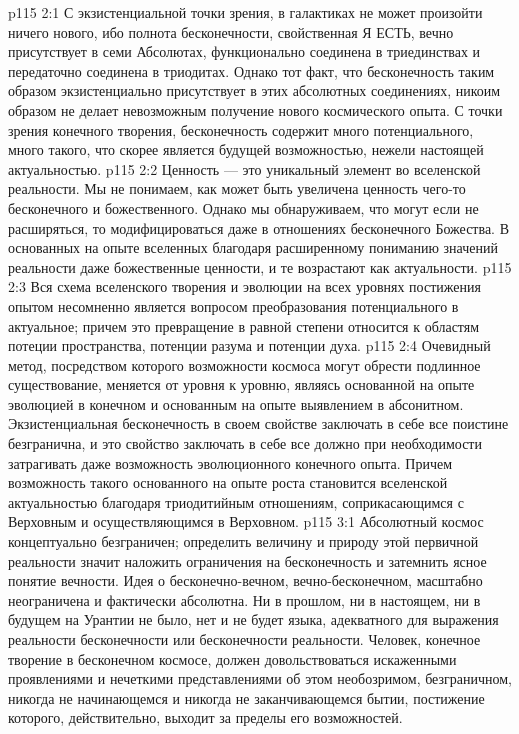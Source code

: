\vs p115 2:1 С экзистенциальной точки зрения, в галактиках не может произойти ничего нового, ибо полнота бесконечности, свойственная Я ЕСТЬ, вечно присутствует в семи Абсолютах, функционально соединена в триединствах и передаточно соединена в триодитах. Однако тот факт, что бесконечность таким образом экзистенциально присутствует в этих абсолютных соединениях, никоим образом не делает невозможным получение нового космического опыта. С точки зрения конечного творения, бесконечность содержит много потенциального, много такого, что скорее является будущей возможностью, нежели настоящей актуальностью.
\vs p115 2:2 Ценность --- это уникальный элемент во вселенской реальности. Мы не понимаем, как может быть увеличена ценность чего\hyp{}то бесконечного и божественного. Однако мы обнаруживаем, что  могут если не расширяться, то модифицироваться даже в отношениях бесконечного Божества. В основанных на опыте вселенных благодаря расширенному пониманию значений реальности даже божественные ценности, и те возрастают как актуальности.
\vs p115 2:3 Вся схема вселенского творения и эволюции на всех уровнях постижения опытом несомненно является вопросом преобразования потенциального в актуальное; причем это превращение в равной степени относится к областям потеции пространства, потенции разума и потенции духа.
\vs p115 2:4 Очевидный метод, посредством которого возможности космоса могут обрести подлинное существование, меняется от уровня к уровню, являясь основанной на опыте эволюцией в конечном и основанным на опыте выявлением в абсонитном. Экзистенциальная бесконечность в своем свойстве заключать в себе все поистине безгранична, и это свойство заключать в себе все должно при необходимости затрагивать даже возможность эволюционного конечного опыта. Причем возможность такого основанного на опыте роста становится вселенской актуальностью благодаря триодитийным отношениям, соприкасающимся с Верховным и осуществляющимся в Верховном.
\vs p115 3:1 Абсолютный космос концептуально безграничен; определить величину и природу этой первичной реальности значит наложить ограничения на бесконечность и затемнить ясное понятие вечности. Идея о бесконечно\hyp{}вечном, вечно\hyp{}бесконечном, масштабно неограничена и фактически абсолютна. Ни в прошлом, ни в настоящем, ни в будущем на Урантии не было, нет и не будет языка, адекватного для выражения реальности бесконечности или бесконечности реальности. Человек, конечное творение в бесконечном космосе, должен довольствоваться искаженными проявлениями и нечеткими представлениями об этом необозримом, безграничном, никогда не начинающемся и никогда не заканчивающемся бытии, постижение которого, действительно, выходит за пределы его возможностей.
